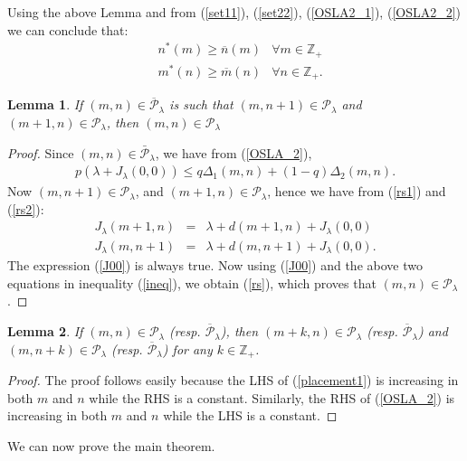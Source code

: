 \documentclass[conference]{IEEEtran}
\newtheorem{lemma}{Lemma}
\begin{document}
Using the above Lemma and from (\ref{set11}), (\ref{set22}),
(\ref{OSLA2_1}), (\ref{OSLA2_2}) we can conclude that:
\begin{eqnarray} 
&n^*(m)\geq \overline{n}(m) & \forall m\in \mathbb{Z}_+ \label{ineq1}\\
&m^*(n)\geq \overline{m}(n) & \forall n\in \mathbb{Z}_+ \label{ineq2}.
\end{eqnarray}

\begin{lemma}
\label{lem33}
If $(m,n)\in\overline{\mathcal{P}}_\lambda$ is such that $(m,n+1)\in\mathcal{P}_\lambda$ and 
$(m+1,n)\in \mathcal{P}_\lambda$, then $(m,n)\in\mathcal{P}_\lambda$
\end{lemma}

\begin{proof}
Since $(m,n)\in \bar{\mathcal{P}}_{\lambda}$, we have from (\ref{OSLA_2}),
\begin{eqnarray} \label{ineq}
p(\lambda+J_{\lambda}(0,0))\leq q\Delta_1(m,n)+(1-q)\Delta_2(m,n).
\end{eqnarray}
Now $(m,n+1)\in \mathcal{P}_\lambda$, and $(m+1,n)\in \mathcal{P}_\lambda$, hence we have from (\ref{rs1}) and (\ref{rs2}):
\begin{eqnarray*}
J_{\lambda}(m+1,n)&=&\lambda+d(m+1,n)+J_{\lambda}(0,0)\\
J_{\lambda}(m,n+1)&=&\lambda+d(m,n+1)+J_{\lambda}(0,0).
\end{eqnarray*}
The expression (\ref{J00}) is always true. Now using (\ref{J00}) and the above two equations in inequality (\ref{ineq}), we obtain (\ref{rs}), which proves that $(m,n)\in \mathcal{P}_\lambda$.
\end{proof}

\begin{lemma} \label{lemma:mplusk}
If $(m,n)\in \mathcal{P}_\lambda$ (resp. $\overline{\mathcal{P}}_\lambda$), then $(m+k,n)\in \mathcal{P}_\lambda$ (resp. $\overline{\mathcal{P}}_\lambda$) and $(m,n+k)\in \mathcal{P}_\lambda$ (resp. $\overline{\mathcal{P}}_\lambda$) for any $k\in \mathbb{Z}_+$.
\end{lemma}
\begin{proof}
The proof follows easily because the LHS of (\ref{placement1}) is increasing in both $m$ and $n$ while the RHS is a constant. Similarly, the RHS of (\ref{OSLA_2}) is increasing in both $m$ and $n$ while the LHS is a constant. 
\end{proof}

We can now prove the main theorem. 
\end{document}
